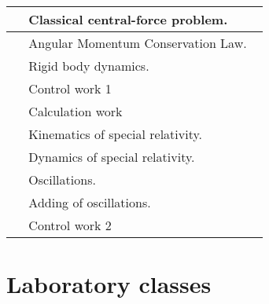 \documentclass{rnp}
\begin{document}
\begin{longtable}{|>{\arraybackslash}m{0.06\linewidth}|>{\raggedright\arraybackslash}m{0.9\linewidth}|}
\hline 
\thead{\rownumber.} 
& Classical central-force problem.
\newline
\cite[\S~1.4]{IrodovProblems}
\\ 
\hline 
\thead{\rownumber.} 
& Angular Momentum Conservation Law.
\newline
\cite[\S~1.3]{IrodovProblems}
\\ 
\hline 
\thead{\rownumber.} 
& Rigid body dynamics.
\newline
\cite[\S~1.5]{IrodovProblems}
\\ 
\hline 
\thead{\rownumber.} 
& Control work 1
\\ 
\hline 
\thead{\rownumber.} 
& Calculation work
\\ 
\hline 
\thead{\rownumber.} 
& Kinematics of special relativity.
\newline
\cite[\S~1.8]{IrodovProblems}
\\ 
\hline 
\thead{\rownumber.} 
& Dynamics of special relativity.
\newline
\cite[\S~1.8]{IrodovProblems}
\\ 
\hline 
\thead{\rownumber.} 
& Oscillations.
\newline
\cite[\S~4.1]{IrodovProblems}
\\ 
\hline 
\thead{\rownumber.} 
& Adding of oscillations.
\newline
\cite[\S~4.1]{IrodovProblems}
\\ 
\hline 
\thead{\rownumber.} 
& Control work 2
\\ 
\hline 
\end{longtable} 

\newpage

%
\section{Laboratory classes}
%
\end{document}
